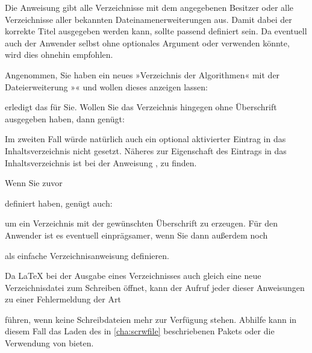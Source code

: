 Die Anweisung  gibt alle
Verzeichnisse mit dem angegebenen Besitzer oder alle Verzeichnisse aller
bekannten Dateinamenerweiterungen aus. Damit dabei der
korrekte Titel ausgegeben werden kann, sollte
 passend definiert sein.
Da eventuell auch der Anwender selbst  ohne
optionales Argument oder  verwenden könnte, wird dies
ohnehin empfohlen.
\begin{Example}
  Angenommen, Sie haben ein neues »Verzeichnis der Algorithmen« mit der
  Dateierweiterung »« und wollen dieses anzeigen lassen:
\begin{lstcode}
\end{lstcode}
  erledigt das für Sie. Wollen Sie das Verzeichnis hingegen ohne Überschrift
  ausgegeben haben, dann genügt:
\begin{lstcode}
\end{lstcode}
  Im zweiten Fall würde natürlich auch ein optional aktivierter Eintrag in das
  Inhaltsverzeichnis nicht gesetzt. Näheres zur Eigenschaft des Eintrags in
  das Inhaltsverzeichnis ist bei der Anweisung
  ,  zu
  finden.

  Wenn Sie zuvor
\begin{lstcode}
  \newcommand*{\listofloaname}{%
    Verzeichnis der Algorithmen%
  }
\end{lstcode}
  definiert haben, genügt auch:
\begin{lstcode}
\end{lstcode}
  um ein Verzeichnis mit der gewünschten Überschrift zu erzeugen. Für den
  Anwender ist es eventuell einprägsamer, wenn Sie dann außerdem noch
\begin{lstcode}
  \newcommand*{\listofalgorithms}{\listoftoc{loa}}
\end{lstcode}
  als einfache Verzeichnisanweisung definieren.
\end{Example}

Da \LaTeX{} bei der Ausgabe eines Verzeichnisses auch
gleich eine neue Verzeichnisdatei zum Schreiben öffnet, kann der Aufruf jeder
dieser Anweisungen zu einer Fehlermeldung der Art
führen, wenn keine Schreibdateien mehr zur Verfügung stehen. Abhilfe kann in
diesem Fall das Laden des in \autoref{cha:scrwfile} beschriebenen Pakets
oder die Verwendung von \LuaLaTeX{} bieten.


